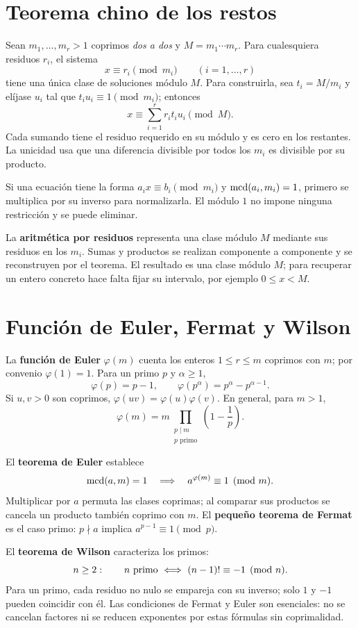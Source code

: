 \section{Teorema chino de los restos}
\label{md:chino}

Sean $m_1,\ldots,m_r>1$ coprimos \emph{dos a dos} y
$M=m_1\cdots m_r$. Para cualesquiera residuos $r_i$, el sistema
\[
 x\equiv r_i\pmod{m_i}\qquad(i=1,\ldots,r)
\]
tiene una única clase de soluciones módulo $M$.
Para construirla, sea $t_i=M/m_i$ y elíjase $u_i$ tal que
$t_iu_i\equiv1\pmod{m_i}$; entonces
\[
 \boxed{x\equiv\sum_{i=1}^r r_it_iu_i\pmod M.}
\]
Cada sumando tiene el residuo requerido en su módulo y es cero en
los restantes. La unicidad usa que una diferencia divisible por todos
los $m_i$ es divisible por su producto.

Si una ecuación tiene la forma $a_ix\equiv b_i\pmod{m_i}$ y
$\operatorname{mcd}(a_i,m_i)=1$, primero se multiplica por su inverso para normalizarla.
El módulo $1$ no impone ninguna restricción y se puede eliminar.

La \textbf{aritmética por residuos} representa una clase módulo $M$
mediante sus residuos en los $m_i$. Sumas y productos se realizan
componente a componente y se reconstruyen por el teorema.
El resultado es una clase módulo $M$; para recuperar un entero concreto
hace falta fijar su intervalo, por ejemplo $0\le x<M$.

\section{Función de Euler, Fermat y Wilson}
\label{md:euler-aritmetico}

La \textbf{función de Euler} $\varphi(m)$ cuenta los enteros
$1\le r\le m$ coprimos con $m$; por convenio $\varphi(1)=1$.
Para un primo $p$ y $\alpha\ge1$,
\[
 \varphi(p)=p-1,\qquad
 \varphi(p^\alpha)=p^\alpha-p^{\alpha-1}.
\]
Si $u,v>0$ son coprimos, $\varphi(uv)=\varphi(u)\varphi(v)$.
En general, para $m>1$,
\[
 \varphi(m)=m\prod_{\substack{p\mid m\\p\text{ primo}}}\left(1-\frac1p\right).
\]

El \textbf{teorema de Euler} establece
\[
 \operatorname{mcd}(a,m)=1\quad\Longrightarrow\quad a^{\varphi(m)}\equiv1\pmod m.
\]
Multiplicar por $a$ permuta las clases coprimas; al comparar sus
productos se cancela un producto también coprimo con $m$.
El \textbf{pequeño teorema de Fermat} es el caso primo:
$p\nmid a$ implica $a^{p-1}\equiv1\pmod p$.

El \textbf{teorema de Wilson} caracteriza los primos:
\[
 n\ge2:\qquad n\text{ primo}\ \eqv\ (n-1)!\equiv-1\pmod n.
\]
Para un primo, cada residuo no nulo se empareja con su inverso;
solo $1$ y $-1$ pueden coincidir con él.
Las condiciones de Fermat y Euler son esenciales: no se cancelan
factores ni se reducen exponentes por estas fórmulas sin coprimalidad.

